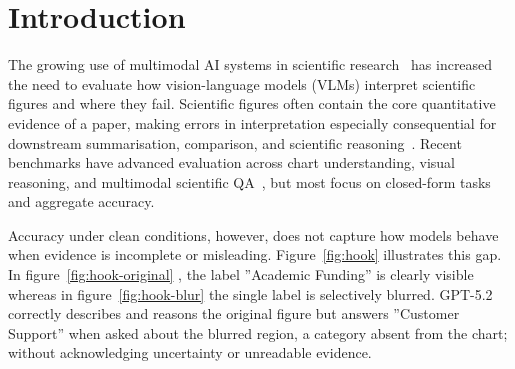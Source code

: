 \section{Introduction}
\label{sec:introduction}

The growing use of multimodal AI systems in scientific research~\citep{yan2025multimodalscience,zhang2025scientificllms} has increased the need to evaluate how vision-language models (VLMs) interpret scientific figures and where they fail. Scientific figures often contain the core quantitative evidence of a paper, making errors in interpretation especially consequential for downstream summarisation, comparison, and scientific reasoning~\citep{wang2024charxiv,huang2024scifibench,tang2025chartmuseum}. Recent benchmarks have advanced evaluation across chart understanding, visual reasoning, and multimodal scientific QA~\citep{masry2022chartqa,lu2024mathvista,yue2024mmmu,wang2024charxiv,tang2025chartmuseum}, but most focus on closed-form tasks and aggregate accuracy.

Accuracy under clean conditions, however, does not capture how models behave when evidence is incomplete or misleading. Figure~\ref{fig:hook} illustrates this gap. In figure~\ref{fig:hook-original} , the label ''Academic Funding'' is clearly visible whereas in figure~\ref{fig:hook-blur} the single label is selectively blurred. GPT-5.2 correctly describes and reasons the original figure but answers ''Customer Support'' when asked about the blurred region, a category absent from the chart; without acknowledging uncertainty or unreadable evidence. 

